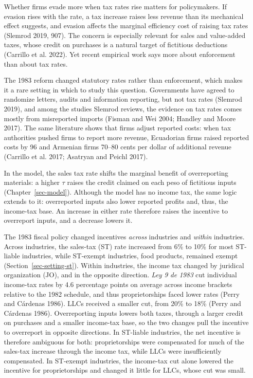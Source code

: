 \documentclass[
  12pt,
  letterpaper,
  oneside,
  openany]{report}
\begin{document}
Whether firms evade more when tax rates rise matters for policymakers.
If evasion rises with the rate, a tax increase raises less revenue than
its mechanical effect suggests, and evasion affects the marginal
efficiency cost of raising tax rates (Slemrod 2019, 907). The concern is
especially relevant for sales and value-added taxes, whose credit on
purchases is a natural target of fictitious deductions (Carrillo et al.
2022). Yet recent empirical work says more about enforcement than about
tax rates.

The 1983 reform changed statutory rates rather than enforcement, which
makes it a rare setting in which to study this question. Governments
have agreed to randomize letters, audits and information reporting, but
not tax rates (Slemrod 2019), and among the studies Slemrod reviews, the
evidence on tax rates comes mostly from misreported imports (Fisman and
Wei 2004; Handley and Moore 2017). The same literature shows that firms
adjust reported costs: when tax authorities pushed firms to report more
revenue, Ecuadorian firms raised reported costs by 96 and Armenian firms
70--80 cents per dollar of additional revenue (Carrillo et al. 2017;
Asatryan and Peichl 2017).

In the model, the sales tax rate shifts the marginal benefit of
overreporting materials: a higher \(\tau\) raises the credit claimed on
each peso of fictitious inputs (Chapter~\ref{sec-model}). Although the
model has no income tax, the same logic extends to it: overreported
inputs also lower reported profits and, thus, the income-tax base. An
increase in either rate therefore raises the incentive to overreport
inputs, and a decrease lowers it.

The 1983 fiscal policy changed incentives \emph{across} industries and
\emph{within} industries. Across industries, the sales-tax (ST) rate
increased from 6\% to 10\% for most ST-liable industries, while
ST-exempt industries, food products, remained exempt
(Section~\ref{sec-setting-st}). Within industries, the income tax
changed by juridical organization (JO), and in the opposite direction.
\emph{Ley 9 de 1983} cut individual income-tax rates by 4.6 percentage
points on average across income brackets relative to the 1982 schedule,
and thus proprietorships faced lower rates (Perry and Cárdenas 1986).
LLCs received a smaller cut, from 20\% to 18\% (Perry and Cárdenas
1986). Overreporting inputs lowers both taxes, through a larger credit
on purchases and a smaller income-tax base, so the two changes pull the
incentive to overreport in opposite directions. In ST-liable industries,
the net incentive is therefore ambiguous for both: proprietorships were
compensated for much of the sales-tax increase through the income tax,
while LLCs were insufficiently compensated. In ST-exempt industries, the
income-tax cut alone lowered the incentive for proprietorships and
changed it little for LLCs, whose cut was small.
\end{document}
